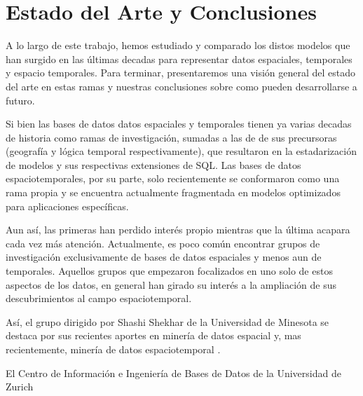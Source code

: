 \chapter{Estado del Arte y Conclusiones}  \label{cap:conc}

A lo largo de este trabajo, hemos estudiado y comparado los distos modelos que han surgido en las últimas decadas para representar datos espaciales, temporales y espacio temporales. Para terminar, presentaremos una visión general del estado del arte en estas ramas y nuestras conclusiones sobre como pueden desarrollarse a futuro.

Si bien las bases de datos datos espaciales y temporales tienen ya varias decadas de historia como ramas de investigación, sumadas a las de de sus precursoras (geografía y lógica temporal respectivamente), que resultaron en la estadarización de modelos y sus respectivas extensiones de SQL. Las bases de datos espaciotemporales, por su parte, solo recientemente se conformaron como una rama propia y se encuentra actualmente fragmentada en modelos optimizados para aplicaciones específicas.

Aun así, las primeras han perdido interés propio mientras que la última acapara cada vez más atención. Actualmente, es poco común encontrar grupos de investigación exclusivamente de bases de datos espaciales y menos aun de temporales. Aquellos grupos que empezaron focalizados en uno solo de estos aspectos de los datos, en general han girado su interés a la ampliación de sus descubrimientos al campo espaciotemporal.

Así, el grupo dirigido por Shashi Shekhar de la Universidad de Minesota se destaca por sus recientes aportes en minería de datos espacial\textsuperscript{\cite{spatial:datamining}} y, mas recientemente, minería de datos espaciotemporal \textsuperscript{\cite{spatiotemporal:datamining}}.

El Centro de Información e Ingeniería de Bases de Datos de la Universidad de Zurich 





